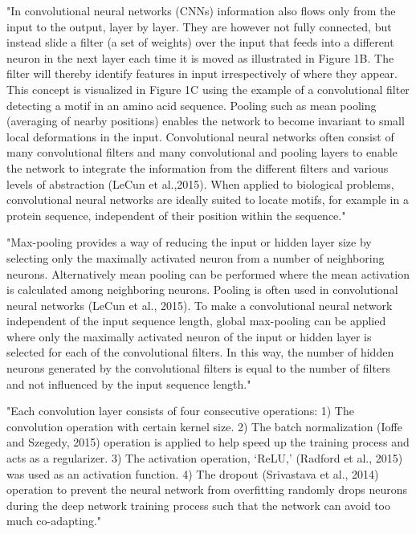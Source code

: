 	"In convolutional neural networks (CNNs) information also flows only from the input to the output, layer by layer. They are however not fully connected, but instead slide a filter (a set of weights) over the input that feeds into a different neuron in the next layer each time it is moved as illustrated in Figure 1B. The filter will thereby identify features in input irrespectively of where they appear. This concept is visualized in Figure 1C using the example of a convolutional filter detecting a motif in an amino acid sequence. Pooling such as mean pooling (averaging of nearby positions) enables the network to become invariant to small local deformations in the input. Convolutional neural networks often consist of many convolutional filters and many convolutional and pooling layers to enable the network to integrate the information from the different filters and various levels of abstraction (LeCun et al.,2015). When applied to biological problems, convolutional neural networks are ideally suited to locate motifs, for example in a protein sequence, independent of their position within the sequence." \cite{Jurtz2017}
	
	"Max-pooling provides a way of reducing the input or hidden layer size by selecting only the maximally activated neuron from a number of neighboring neurons. Alternatively mean pooling can be performed where the mean activation is calculated among neighboring neurons. Pooling is often used in convolutional neural networks (LeCun et al., 2015). To make a convolutional neural network independent of the input sequence length, global max-pooling can be applied where only the maximally activated neuron of the input or hidden layer is selected for each of the convolutional filters. In this way, the number of hidden neurons generated by the convolutional filters is equal to the number of filters and not influenced by the input sequence length." \cite{Jurtz2017}
	
	"Each convolution layer consists of four consecutive operations: 1) The convolution operation with certain kernel size. 2) The batch normalization (Ioffe and Szegedy, 2015) operation is applied to help speed up
	the training process and acts as a regularizer. 3) The activation operation, ‘ReLU,’ (Radford et al., 2015) was used as an activation function. 4) The dropout (Srivastava et al., 2014) operation to prevent the neural network from overfitting randomly drops neurons during the deep network training process such that the network can avoid too much co-adapting." \cite{Fang2017}
	

